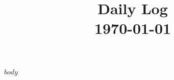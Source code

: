 \documentclass[11pt,a4paper]{article}
\title{\Huge\textbf{\color{primaryblue}Daily Log}\\[0.3em]\Large\today}
\author{}
\date{}
\begin{document}
\maketitle
\thispagestyle{fancy}

$body$
\end{document}
